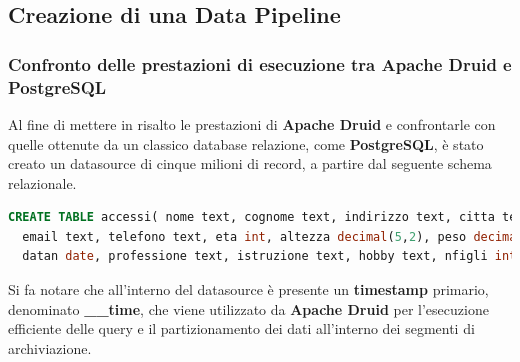 \subsection{Creazione di una Data Pipeline}
\subsubsection{Confronto delle prestazioni di esecuzione tra Apache Druid e PostgreSQL}\label{sec:confronto_prestazioni1}
Al fine di mettere in risalto le prestazioni di \textbf{Apache Druid} e confrontarle con quelle ottenute da un classico database relazione, come \textbf{PostgreSQL}, è stato creato un \gls{datasource}{} di cinque milioni di record, a partire 
dal seguente schema relazionale.
\begin{lstlisting}[language=SQL]
  CREATE TABLE accessi( nome text, cognome text, indirizzo text, citta text, stato text, cap int, 
  email text, telefono text, eta int, altezza decimal(5,2), peso decimal(5,2), reddito decimal(6,2), 
  datan date, professione text, istruzione text, hobby text, nfigli int, codice_cliente int, datareg timestamp,__time timestamp)    
\end{lstlisting}
Si fa notare che all'interno del \gls{datasource}{} è presente un \textbf{timestamp} primario, denominato \textbf{\_\_time}, che viene utilizzato da \textbf{Apache Druid} per l'esecuzione 
efficiente delle query e il partizionamento dei dati all'interno dei segmenti di archiviazione.
